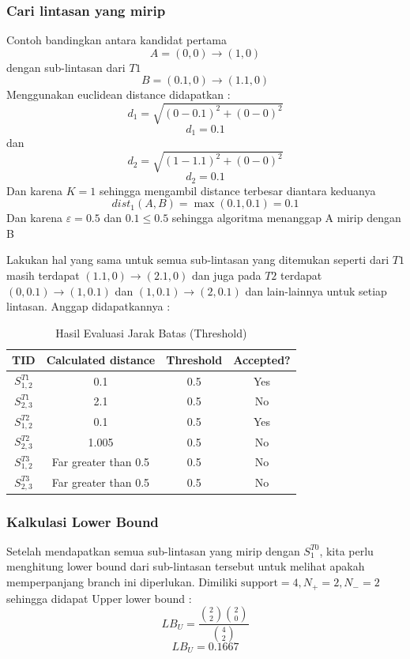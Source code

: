 \documentclass[a4paper,twoside]{article}
\begin{document}
\subsubsection{Cari lintasan yang mirip}
Contoh bandingkan antara kandidat pertama
\[ A = (0, 0) \rightarrow (1, 0) \]
dengan sub-lintasan dari $T1$
\[ B =  (0.1, 0) \rightarrow (1.1, 0) \]
Menggunakan euclidean distance didapatkan :
\[ d_1=\sqrt{(0-0.1)^2+(0-0)^2} \]
\[ d_1=0.1 \]
dan
\[ d_2=\sqrt{(1-1.1)^2+(0-0)^2} \]
\[ d_2=0.1 \]
Dan karena $K = 1$ sehingga mengambil distance terbesar diantara keduanya 
\[ dist_1(A,B)=\max(0.1,0.1)=0.1 \]
Dan karena $\varepsilon = 0.5$ dan $0.1 \leq 0.5$ sehingga algoritma menanggap A mirip dengan B

Lakukan hal yang sama untuk semua sub-lintasan yang ditemukan seperti dari $T1$ masih terdapat $(1.1, 0) \rightarrow (2.1, 0)$ dan juga pada $T2$ terdapat $(0,0.1) \rightarrow (1, 0.1)$ dan $(1, 0.1) \rightarrow (2, 0.1)$ dan lain-lainnya untuk setiap lintasan.
Anggap didapatkannya :
\begin{table}[H]
    \centering
    \caption{Hasil Evaluasi Jarak Batas (Threshold)}
    \label{tab:jarak_threshold}
    \begin{tabular}{cccc}
        \hline
        \textbf{TID} & \textbf{Calculated distance} & \textbf{Threshold} & \textbf{Accepted?} \\ \hline
        $S_{1,2}^{T1}$   & 0.1                          & 0.5                & Yes                \\
        $S_{2,3}^{T1}$   & 2.1                          & 0.5                & No                 \\
        $S_{1,2}^{T2}$   & 0.1                          & 0.5                & Yes                \\
        $S_{2,3}^{T2}$   & 1.005                        & 0.5                & No                 \\
        $S_{1,2}^{T3}$   & Far greater than 0.5         & 0.5                & No                 \\
        $S_{2,3}^{T3}$   & Far greater than 0.5         & 0.5                & No                 \\ \hline
    \end{tabular}
\end{table}

\subsubsection{Kalkulasi Lower Bound}
Setelah mendapatkan semua sub-lintasan yang mirip dengan $S_1^{T0}$, kita perlu menghitung lower bound dari sub-lintasan tersebut untuk melihat apakah memperpanjang branch ini diperlukan.
Dimiliki $\text{support} = 4, N_+ = 2, N_- = 2$ sehingga didapat
Upper lower bound : 
\[ LB_U = \frac{\binom{2}{2}\binom{2}{0}}{\binom{4}{2}} \]
\[ LB_U = 0.1667 \]
\end{document}

